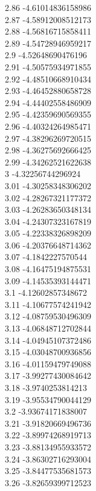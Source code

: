 {2.86	-4.61014836158986\\
2.87	-4.58912008512173\\
2.88	-4.56816715858411\\
2.89	-4.54728946959217\\
2.9	-4.52648690476196\\
2.91	-4.50575934971855\\
2.92	-4.48510668910434\\
2.93	-4.46452880658728\\
2.94	-4.44402558486909\\
2.95	-4.42359690569355\\
2.96	-4.40324264985471\\
2.97	-4.38296269720515\\
2.98	-4.36275692666425\\
2.99	-4.34262521622638\\
3	-4.32256744296924\\
3.01	-4.30258348306202\\
3.02	-4.28267321177372\\
3.03	-4.26283650348134\\
3.04	-4.24307323167819\\
3.05	-4.22338326898209\\
3.06	-4.20376648714362\\
3.07	-4.1842227570544\\
3.08	-4.16475194875531\\
3.09	-4.14535393144471\\
3.1	-4.12602857348672\\
3.11	-4.10677574241942\\
3.12	-4.08759530496309\\
3.13	-4.06848712702844\\
3.14	-4.04945107372486\\
3.15	-4.03048700936856\\
3.16	-4.01159479749088\\
3.17	-3.99277430084642\\
3.18	-3.9740253814213\\
3.19	-3.95534790044129\\
3.2	-3.93674171838007\\
3.21	-3.91820669496736\\
3.22	-3.89974268919713\\
3.23	-3.88134955933572\\
3.24	-3.86302716293004\\
3.25	-3.84477535681573\\
3.26	-3.82659399712523\\
}
